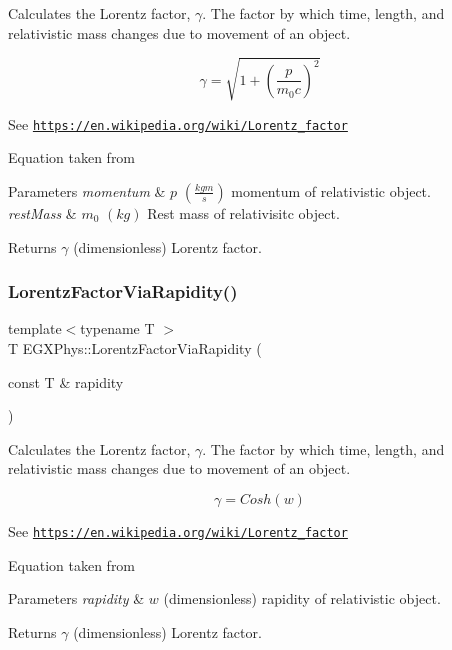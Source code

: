 Calculates the Lorentz factor, $\gamma$. The factor by which time, length, and relativistic mass changes due to movement of an object. 

\[\gamma=\sqrt{1+(\frac{p}{m_0 c})^2}\]

See \href{https://en.wikipedia.org/wiki/Lorentz_factor}{\tt https\+://en.\+wikipedia.\+org/wiki/\+Lorentz\+\_\+factor}

Equation taken from


\begin{DoxyParams}{Parameters}
{\em momentum} & $p$ $(\frac{kg m}{s})$ momentum of relativistic object. \\
\hline
{\em rest\+Mass} & $m_0$ $(kg)$ Rest mass of relativisitc object. \\
\hline
\end{DoxyParams}
\begin{DoxyReturn}{Returns}
$\gamma$ (dimensionless) Lorentz factor. 
\end{DoxyReturn}
\mbox{\label{group___relativity_ga8064f5bce1d2ca5f7bc39d95ba4d2dd9}} 
\subsubsection{\texorpdfstring{Lorentz\+Factor\+Via\+Rapidity()}{LorentzFactorViaRapidity()}}
{\footnotesize\ttfamily template$<$typename T $>$ \\
T E\+G\+X\+Phys\+::\+Lorentz\+Factor\+Via\+Rapidity (\begin{DoxyParamCaption}\item[{const T \&}]{rapidity }\end{DoxyParamCaption})}



Calculates the Lorentz factor, $\gamma$. The factor by which time, length, and relativistic mass changes due to movement of an object. 

\[\gamma=Cosh(w)\]

See \href{https://en.wikipedia.org/wiki/Lorentz_factor}{\tt https\+://en.\+wikipedia.\+org/wiki/\+Lorentz\+\_\+factor}

Equation taken from


\begin{DoxyParams}{Parameters}
{\em rapidity} & $w$ (dimensionless) rapidity of relativistic object. \\
\hline
\end{DoxyParams}
\begin{DoxyReturn}{Returns}
$\gamma$ (dimensionless) Lorentz factor. 
\end{DoxyReturn}
